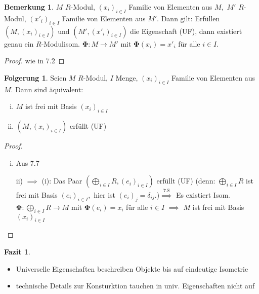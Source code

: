\documentclass[a4paper, titlepage]{article}
\theoremstyle{definition}
\newtheorem{Folgerung}[satz]{Folgerung}
\newtheorem{bem}[satz]{Bemerkung}
\newtheorem*{fazit}{Fazit}
\begin{document}
        \begin{bem}
            $M$ $R$-Modul, $(x_i)_{i\in I}$ Familie von Elementen aus $M,$ $M'$ $R$-Modul, $(x'_i)_{i\in I}$ Familie von Elementen aus $M'.$ Dann gilt:\newline
            Erfüllen $(M,(x_i)_{i\in I})$ und $(M',(x'_i)_{i\in I})$ die Eigenschaft (UF), dann existiert genau ein $R$-Modulisom. $\boldsymbol{\Phi}:M\longrightarrow M'$ mit $\boldsymbol{\Phi}(x_i)=x'_i$ für alle $i\in I.$
        \end{bem}
        \begin{proof}
            wie in 7.2
        \end{proof}
        \begin{Folgerung}
            Seien $M$ $R$-Modul, $I$ Menge, $(x_i)_{i\in I}$ Familie von Elementen aus $M$. Dann sind äquivalent:
            \begin{enumerate}[(i)]
                \item $M$ ist frei mit Basis $(x_i)_{i\in I}$
                \item $(M,(x_i)_{i\in I})$ erfüllt (UF)
            \end{enumerate}
        \end{Folgerung}
        \begin{proof}
            \begin{enumerate}[(i) $\implies$ (ii):]
                \item Aus 7.7
                \item [ii) $\implies$ (i):] Das Paar $(\bigoplus\limits_{i\in I}R,(e_i)_{i\in I})$ erfüllt (UF) (denn: $\bigoplus\limits_{i\in I}R$ ist frei mit Basis $(e_i)_{i\in I},$ hier ist $(e_i)_j=\delta_{ij}.$)$\overset{7.8}{\implies}$ Es existiert Isom. $\boldsymbol{\Phi}:\bigoplus\limits_{i\in I}R\longrightarrow M$ mit $\boldsymbol{\Phi}(e_i)=x_i$ für alle $i\in I$ $\implies$ $M$ ist frei mit Basis $(x_i)_{i\in I}$
            \end{enumerate}
        \end{proof}
        \begin{fazit}
            \begin{itemize}
                \item Universelle Eigenschaften beschreiben Objekte bis auf eindeutige Isometrie
                \item technische Details zur Konsturktion tauchen in univ. Eigenschaften nicht auf
            \end{itemize}
        \end{fazit}
\end{document}
